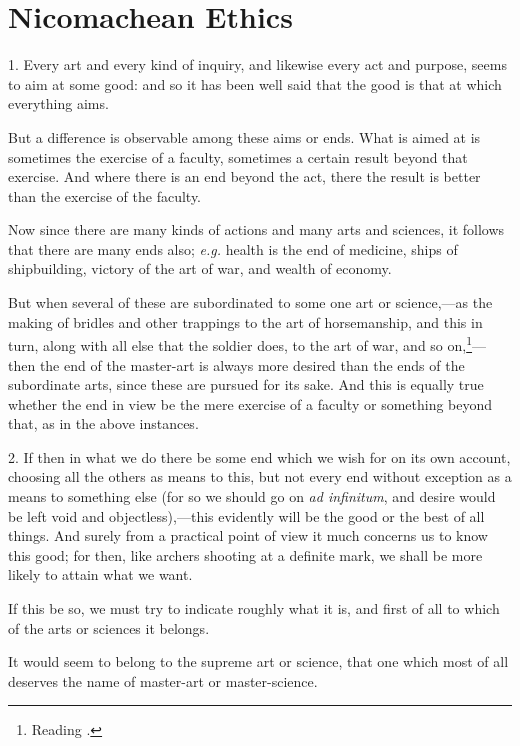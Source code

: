 
\author{Aristotle}
\chapter[Nicomachean Ethics, bk. 1]{Nicomachean Ethics}

1. Every art and every kind of inquiry, and likewise every act
and purpose, seems to aim at some good: and so it has been well said
that the good is that at which everything aims.

But a difference is observable among these aims or ends. What is aimed
at is sometimes the exercise of a faculty, sometimes a certain result
beyond that exercise. And where there is an end beyond the act, there
the result is better than the exercise of the faculty.

Now since there are many kinds of actions and many arts and sciences,
it follows that there are many ends also; \textit{e.g.} health is the
end of medicine, ships of shipbuilding, victory of the art of war, and
wealth of economy.

But when several of these are subordinated to  some one art or
science,---as the making of bridles and other trappings to the art of
horsemanship, and this in turn, along with all else that the soldier
does, to the art of war, and so on,\footnote{Reading .}---then the end of the master-art is always more desired than the
ends of the subordinate arts, since these are pursued for its sake.
And this is equally true whether the end in view be the mere exercise
of a faculty or something beyond that, as in the above instances.

2. If then in what we do there be some end which we wish for on its
own account, choosing all the others as means to this, but not every
end without exception as a means to something else (for so we should
go on \textit{ad infinitum}, and desire would be left void and
objectless),---this evidently will be the good or the best of all
things. And surely from a practical point of view it much concerns us
to know this good; for then, like archers shooting at a definite mark,
we shall be more likely to attain what we want.

If this be so, we must try to indicate roughly what it is, and first
of all to which of the arts or sciences it belongs.

It would seem to belong to the supreme art or science, that one which
most of all deserves the name of master-art or master-science.

